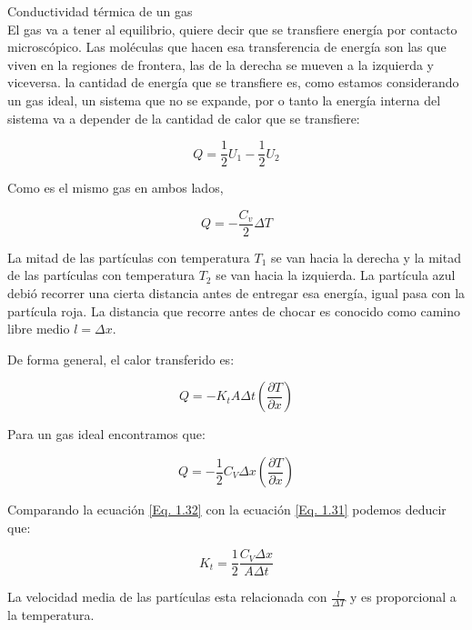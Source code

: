 \documentclass[11pt,fleqn]{book}
\begin{document}
\begin{example}
Conductividad térmica de un gas\\
El gas va a tener al equilibrio, quiere decir que se transfiere energía por contacto microscópico. Las moléculas que hacen esa transferencia de energía son las que viven en la regiones de frontera, las de la derecha se mueven a la izquierda y viceversa. la cantidad de energía que se transfiere es, como estamos considerando un gas ideal, un sistema que no se expande, por o tanto la energía interna del sistema va a depender de la cantidad de calor que se transfiere:

\begin{equation*}
    Q=\frac{1}{2}U_{1}-\frac{1}{2}U_{2}
\end{equation*}

Como es el mismo gas en ambos lados,

\begin{equation*}
    Q=-\frac{C_{v}}{2}\Delta T
\end{equation*}

La mitad de las partículas con temperatura $T_{1}$ se van hacia la derecha y la mitad de las partículas con temperatura $T_{2}$ se van hacia la izquierda. La partícula azul debió recorrer una cierta distancia antes de entregar esa energía, igual pasa con la partícula roja. La distancia que recorre antes de chocar es conocido como camino libre medio $l=\Delta x$.  
\end{example}

De forma general, el calor transferido es:

\begin{equation}
    Q=-K_{t}A\Delta  t\left(\frac{\partial T}{\partial x}\right)
    \label{Eq. 1.31}
\end{equation}

Para un gas ideal encontramos que:

\begin{equation}
    Q=-\frac{1}{2}C_{V}\Delta x\left(\frac{\partial T}{\partial x}\right)
    \label{Eq. 1.32}
\end{equation}

Comparando la ecuación \ref{Eq. 1.32} con la ecuación \ref{Eq. 1.31} podemos deducir que:

\begin{equation}
    K_{t}=\frac{1}{2}\frac{C_{V}\Delta x}{A\Delta t}
    \label{Eq. 1.33}
\end{equation}

La velocidad media de las partículas esta relacionada con $\frac{l}{\Delta T}$ y es proporcional a la temperatura. 
\end{document}
